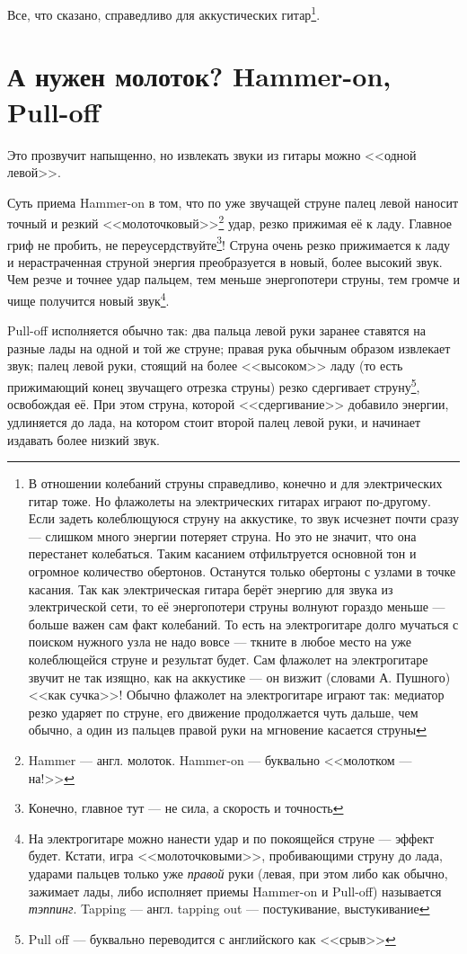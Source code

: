Все, что сказано, справедливо для аккустических гитар\footnote{В отношении колебаний струны справедливо, конечно и для электрических гитар тоже. Но флажолеты на электрических гитарах играют по-другому. Если задеть колеблющуюся струну на аккустике, то звук исчезнет почти сразу --- слишком много энергии потеряет струна. Но это не значит, что она перестанет колебаться. Таким касанием отфильтруется основной тон и огромное количество обертонов. Останутся только обертоны с узлами в точке касания. Так как электрическая гитара берёт энергию для звука из электрической сети, то её энергопотери струны волнуют гораздо меньше --- больше важен сам факт колебаний. То есть на электрогитаре долго мучаться с поиском нужного узла не надо вовсе --- ткните в любое место на уже колеблющейся струне и результат будет. Сам флажолет на электрогитаре звучит не так изящно, как на аккустике --- он визжит (словами А. Пушного) <<как сучка>>! Обычно флажолет на электрогитаре играют так: медиатор резко ударяет по струне, его движение продолжается чуть дальше, чем обычно, а один из пальцев правой руки на мгновение касается струны}.


\section{А нужен молоток? Hammer-on, Pull-off}

Это прозвучит напыщенно, но извлекать звуки из гитары можно <<одной левой>>.

Суть приема Hammer-on в том, что по уже звучащей струне палец левой наносит точный и резкий <<молоточковый>>\footnote{Hammer --- англ. молоток. Hammer-on --- буквально <<молотком --- на!>>} удар, резко прижимая её к ладу. Главное гриф не пробить, не переусердствуйте\footnote{Конечно, главное тут --- не сила, а скорость и точность}! Струна очень резко прижимается к ладу и нерастраченная струной энергия преобразуется в новый, более высокий звук. Чем резче и точнее удар пальцем, тем меньше энергопотери струны, тем громче и чище получится новый звук\footnote{На электрогитаре можно нанести удар и по покоящейся струне --- эффект будет. Кстати, игра <<молоточковыми>>, пробивающими струну до лада, ударами пальцев только уже \emph{правой} руки (левая, при этом либо как обычно, зажимает лады, либо исполняет приемы Hammer-on и Pull-off) называется \emph{тэппинг}. Tapping --- англ. tapping out --- постукивание, выстукивание}.

Pull-off исполняется обычно так: два пальца левой руки заранее ставятся на разные лады на одной и той же струне; правая рука обычным образом извлекает звук; палец левой руки, стоящий на более <<высоком>> ладу (то есть прижимающий конец звучащего отрезка струны) резко сдергивает струну\footnote{Pull off --- буквально переводится с английского как <<срыв>>}, освобождая её. При этом струна, которой <<сдергивание>> добавило энергии, удлиняется до лада, на котором стоит второй палец левой руки, и начинает издавать более низкий звук.

